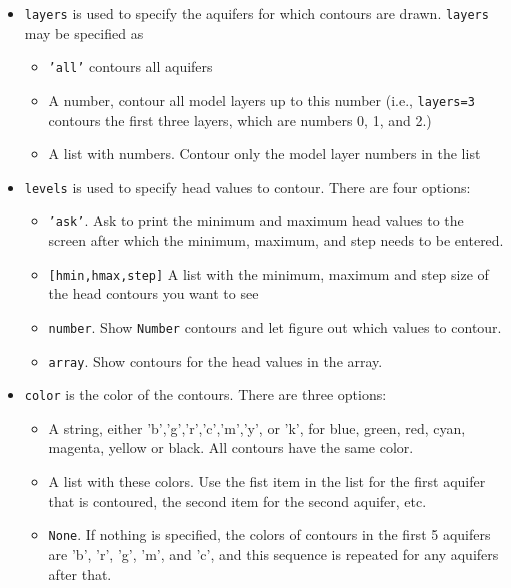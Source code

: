 \documentclass [10pt,letterpaper] {article}
\begin{document}
\begin{itemize}
\item {\tt layers} is used to specify the aquifers for which contours are drawn. {\tt layers} may be specified as
\begin{itemize}
\item {\tt 'all'} contours all aquifers
\item A number, contour all model layers up to this number (i.e., {\tt layers=3} contours the first
three layers, which are numbers 0, 1, and 2.)
\item A list with numbers. Contour only the model layer numbers in the list
\end{itemize}

\item {\tt levels} is used to specify head values to contour. There are four options:
\begin{itemize}
\item {\tt 'ask'}. Ask \Timsp to print the minimum and maximum head values to the screen after which the minimum, maximum, and step needs to be entered.
\item {\tt [hmin,hmax,step]} A list with the minimum, maximum and step size of the head contours you want to see
\item {\tt number}. Show {\tt Number} contours and let \Timsp figure out which values to contour.
\item {\tt array}. Show contours for the head values in the array.
\end{itemize} 

\item{\tt color} is the color of the contours. There are three options:
\begin{itemize}
\item A string, either 'b','g','r','c','m','y', or 'k', for blue, green, red, cyan, magenta, yellow or black. All contours have the same color.
\item A list with these colors. Use the fist item in the list for the first aquifer that is contoured, the second item for the second aquifer, etc.
\item {\tt None}. If nothing is specified, the colors of contours in the first 5 aquifers are 'b', 'r', 'g', 'm', and 'c', and this sequence is repeated for any aquifers after that.
\end{itemize}


\end{itemize}
\end{document}
